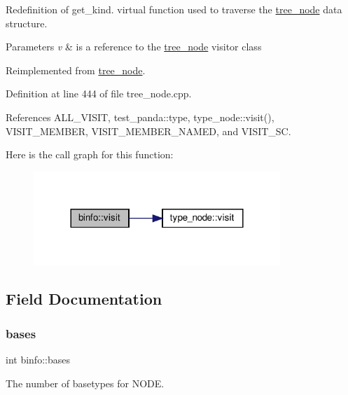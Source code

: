 Redefinition of get\+\_\+kind. virtual function used to traverse the \hyperlink{classtree__node}{tree\+\_\+node} data structure. 
\begin{DoxyParams}{Parameters}
{\em v} & is a reference to the \hyperlink{classtree__node}{tree\+\_\+node} visitor class \\
\hline
\end{DoxyParams}


Reimplemented from \hyperlink{classtree__node_aa9abba3f1b30e0be80b4a56b188c6ecc}{tree\+\_\+node}.



Definition at line 444 of file tree\+\_\+node.\+cpp.



References A\+L\+L\+\_\+\+V\+I\+S\+IT, test\+\_\+panda\+::type, type\+\_\+node\+::visit(), V\+I\+S\+I\+T\+\_\+\+M\+E\+M\+B\+ER, V\+I\+S\+I\+T\+\_\+\+M\+E\+M\+B\+E\+R\+\_\+\+N\+A\+M\+ED, and V\+I\+S\+I\+T\+\_\+\+SC.

Here is the call graph for this function\+:
\nopagebreak
\begin{figure}[H]
\begin{center}
\leavevmode
\includegraphics[width=264pt]{d2/db5/structbinfo_adc2b24cc31b9f03ae787f9f625405883_cgraph}
\end{center}
\end{figure}


\subsection{Field Documentation}
\mbox{\label{structbinfo_a2da852932673d31958a4e4fae598a26c}} 
\subsubsection{\texorpdfstring{bases}{bases}}
{\footnotesize\ttfamily int binfo\+::bases}



The number of basetypes for N\+O\+DE. 



